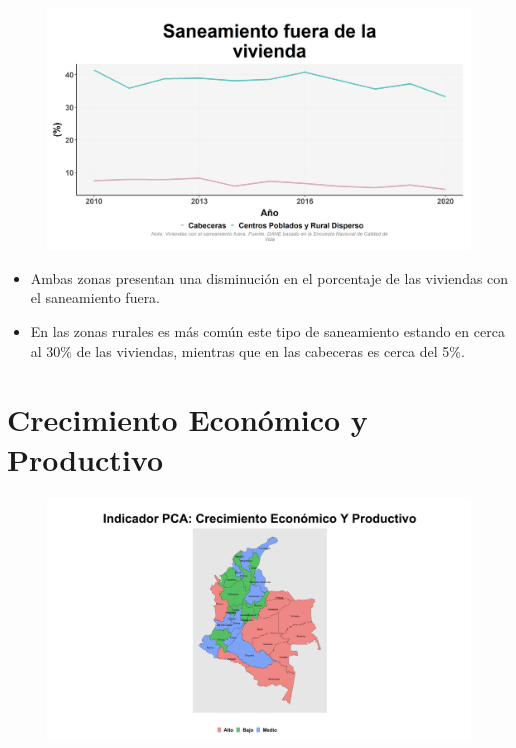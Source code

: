     \begin{figure}[H]
        \caption[Saneamiento fuera de la vivienda por zonas ]{\label{saneamiento_fuera_zonas} }
        \begin{center}
        \includegraphics[width=\textwidth,keepaspectratio]{img/var_196_trend.png}
        \end{center}
    \end{figure}
            \begin{itemize}
                    \item Ambas zonas presentan una disminución en el porcentaje de las viviendas con el saneamiento fuera.
                    \item En las zonas rurales es más común este tipo de saneamiento estando en cerca al 30\% de las viviendas, mientras que en las cabeceras es cerca del 5\%.
                    \end{itemize}

\section{Crecimiento Económico y Productivo}

\begin{figure}[H]
        \caption[Indicador Pulso Social sobre Crecimiento Económico y Productivo]{\label{pca_pobreza} }
        \begin{center}
        \includegraphics[width=\textwidth,keepaspectratio]{pca_clusters/pca_crecimiento_economico_y_productivo_pca.png}
        \end{center}
    \end{figure}

